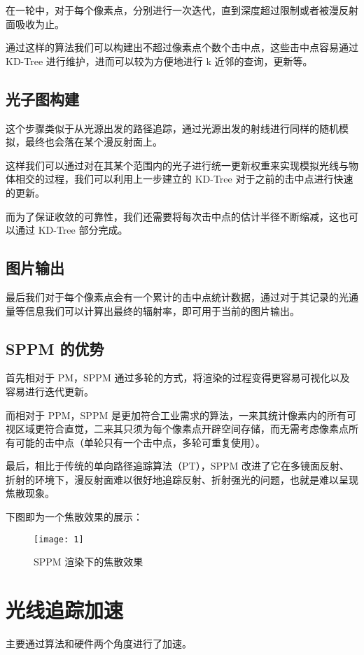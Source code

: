 \documentclass[a4paper]{article}
\begin{document}
    在一轮中，对于每个像素点，分别进行一次迭代，直到深度超过限制或者被漫反射面吸收为止。

    通过这样的算法我们可以构建出不超过像素点个数个击中点，这些击中点容易通过 KD-Tree 进行维护，进而可以较为方便地进行 k 近邻的查询，更新等。

    \subsection{光子图构建}
    这个步骤类似于从光源出发的路径追踪，通过光源出发的射线进行同样的随机模拟，最终也会落在某个漫反射面上。

    这样我们可以通过对在其某个范围内的光子进行统一更新权重来实现模拟光线与物体相交的过程，我们可以利用上一步建立的 KD-Tree 对于之前的击中点进行快速的更新。

    而为了保证收敛的可靠性，我们还需要将每次击中点的估计半径不断缩减，这也可以通过 KD-Tree 部分完成。

    \subsection{图片输出}
    最后我们对于每个像素点会有一个累计的击中点统计数据，通过对于其记录的光通量等信息我们可以计算出最终的辐射率，即可用于当前的图片输出。

    \subsection{SPPM 的优势}
    首先相对于 PM，SPPM 通过多轮的方式，将渲染的过程变得更容易可视化以及容易进行迭代更新。

    而相对于 PPM，SPPM 是更加符合工业需求的算法，一来其统计像素内的所有可视区域更符合直觉，二来其只须为每个像素点开辟空间存储，而无需考虑像素点所有可能的击中点（单轮只有一个击中点，多轮可重复使用）。

    最后，相比于传统的单向路径追踪算法（PT），SPPM 改进了它在多镜面反射、折射的环境下，漫反射面难以很好地追踪反射、折射强光的问题，也就是难以呈现焦散现象。

    下图即为一个焦散效果的展示：

    \begin{figure}[h]
        \centering
        \texttt{[image: 1]}
        \caption{SPPM 渲染下的焦散效果}
        \label{fig1}
    \end{figure}

    \newpage
    \section{光线追踪加速}
    主要通过算法和硬件两个角度进行了加速。
\end{document}
